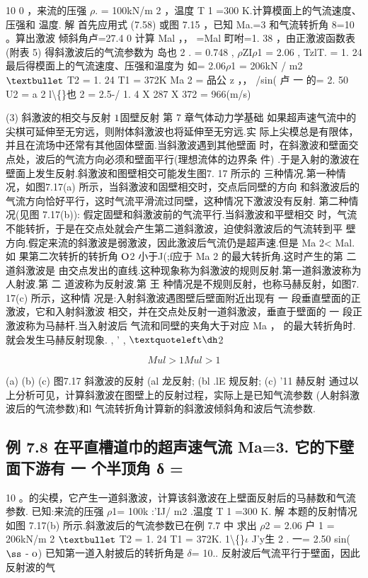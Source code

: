 10 0 ，来流的压强 $\rho$. = 100kN/m 2 ，温度 T 1 =300 K.计算模面上的气流速度、压强和 温度. 解 首先应用式 (7.58) 或图 7.15 ，已知 Ma.=3 和气流转折角 8=10 。算出激波 倾斜角卢=27.4 0 计算 Mal ，， =Mal 町咐=1. 38 ，由正激波函数表(附表 5) 得斜激波后的气流参数为 岛也 2 . = 0.748 , $\rho$ZI$\rho$1 = 2.06 , TzlT. = 1. 24 最后得模面上的气流速度、压强和温度为 如= 2.06$\rho$1 = 206kN / m2 ${\rm •}$ T2 = 1. 24 T1 = 372K Ma 2 = 品公 z ，， /sin( 卢 一 的= 2. 50 U2 = a 2 l\textbackslash\{\}也 2 = 2.5-/ 1. 4 X 287 X 372 = 966(m/s)

(3) 斜激波的相交与反射 ${\rm 1}$固壁反射 第 7 章气体动力学基础 如果超声速气流中的尖棋可延伸至无穷远，则附体斜激波也将延伸至无穷远.实 际上尖模总是有限体，并且在流场中还常有其他固体壁面.当斜激波遇到其他壁面 时，在斜激波和壁面交点处，波后的气流方向必须和壁面平行(理想流体的边界条 件) .于是入射的激波在壁面上发生反射.斜激波和图壁相交可能发生图7. 17 所示的 三种情况.第一种情况，如图7.17(a) 所示，当斜激波和固壁相交时，交点后同壁的方向 和斜激波后的气流方向恰好平行，这时气流平滑流过同壁，这种情况下激波没有反射. 第二种情况(见图 7.17(b)): 假定固壁和斜激波前的气流平行.当斜激波和平壁相交 时，气流不能转折，于是在交点处就会产生第二道斜激波，迫使斜激波后的气流转到平 壁方向.假定来流的斜激波是弱激波，因此激波后气流仍是超声速.但是 Ma 2< Mal. 如 果第二次转折的转折角 ${\rm O}$2 小于J(;f应于 Ma 2 的最大转折角.这时产生的第 二 道斜激波是 由交点发出的直线.这种现象称为斜激波的规则反射.第一道斜激波称为人射波.第 二 道波称为反射波.第 王 种情况是不规则反射，也称马赫反射，如图7. 17(c) 所示，这种情 况是:入射斜激波遇图壁后壁面附近出现有 一 段垂直壁面的正激波，它和入射斜激波 相交，并在交点处反射一道斜激波，垂直于壁面的 一 段正激波称为马赫杆.当入射波后 气流和同壁的夹角大于对应 Ma ， 的最大转折角时.就会发生马赫反射现象. , ' , ${\rm ‘ð}$2

\[Mul >1 Mul>1\]

(a) (b) (c) 图7.17 斜激波的反射 (al 龙反射; (bl .lE 规反射; (c) '11 赫反射 通过以上分析可见，计算斜激波在图壁上的反射过程，实际上是已知气流参数 (人射斜激波后的气流参数)和l 气流转折角计算新的斜激波倾斜角和波后气流参数.

\subsection*{例 7.8  在平直槽道巾的超声速气流 Ma=3. 它的下壁面下游有 一 个半顶角 δ =}

10 。的尖模，它产生一道斜激波，计算该斜激波在上壁面反射后的马赫数和气流参数. 已知:来流的压强 $\rho$1= 100k :'IJ/ m2 .温度 T 1 =300 K. 解 本题的反射情况如图 7.17(b) 所示.斜激波后的气流参数已在例 7.7 中 求出 $\rho$2 = 2.06 户 1 = 206kN/m 2 ${\rm •}$ T2 = 1. 24 T1 = 372K. 1\textbackslash\{\}$\iota$ J'y生 2 . 一= 2.50 sin(${\rm ß}$ - ${\rm o}$) 已知第一道入射披后的转折角是 $\delta$= 10.. 反射波后气流平行于壁面，因此反射波的气

